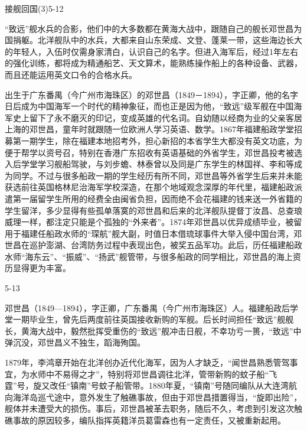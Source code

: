 \documentclass[12pt,UTF8]{ctexbook}
\begin{document}
接舰回国(3)5-12

“致远”舰水兵的合影，他们中的大多数都在黄海大战中，跟随自己的舰长邓世昌为国捐躯。北洋舰队中的水兵，大都来自山东荣成、文登、蓬莱一带，这些海边长大的年轻人，入伍时仅需身家清白，认识自己的名字。但进入海军后，经过1年左右的强化训练，都将成为精通船艺、天文算术，能熟练操作船上的各种设备、武器，而且还能运用英文口令的合格水兵。

出生于广东番禺（今广州市海珠区）的邓世昌（1849－1894），字正卿，他的名字日后成为中国海军一个时代的精神象征，而也正是因为他，“致远”级军舰在中国海军史上留下了永不磨灭的印记，变成英雄的代名词。自幼随以经商为业的父亲客居上海的邓世昌，童年时就跟随一位欧洲人学习英语、数学。1867年福建船政学堂招募第一期学生，除在福建本地招考外，担心新招的本省学生大都没有英文功底，为便于帮学以资号召，特别在香港广东招收有英语基础的外省学生，邓世昌投考被选入后学堂学习舰船驾驶，与刘步蟾、林泰曾以及同是广东学生的林国祥、李和等成为同学。不过与很多船政一期的学生经历有所不同，邓世昌等外省学生后来并未能获选前往英国格林尼治海军学校深造，在那个地域观念深厚的年代里，福建船政派遣第一届留学生所用的经费全由闽省负担，因而绝不会花福建的钱来送一外省籍的学生留洋，多少显得有些孤单落寞的邓世昌和后来的北洋舰队提督丁汝昌、总查琅威理一样，都注定只能是个孤独的“外来者”。1874年邓世昌以优异成绩毕业，被留用于福建任船政水师的“琛航”舰大副，时值日本借琉球事件大举入侵中国台湾，邓世昌在巡护澎湖、台湾防务过程中表现出色，被奖五品军功。此后，历任福建船政水师“海东云”、“振威”、“扬武”舰管带，与很多船政的同学相比，邓世昌的海上资历显得更为丰富。

5-13

邓世昌（1849—1894），字正卿，广东番禺（今广州市海珠区）人。福建船政后学堂一期毕业生，曾先后两度前往英国接收新购的军舰。后长时间担任“致远”舰舰长，黄海大战中，毅然批挥受重伤的“致远”舰冲击日舰，不幸功亏一篑，“致远”中弹沉没，邓世昌义不独生，蹈海殉国。

1879年，李鸿章开始在北洋创办近代化海军，因为人才缺乏，“闻世昌熟悉管驾事宜，为水师中不易得之才”，特别将邓世昌调往北洋，管带新购的蚊子船“飞霆”号，旋又改任“镇南”号蚊子船管带。1880年夏，“镇南”号随同编队从大连湾航向海洋岛巡弋途中，意外发生了触礁事故，但由于邓世昌措置得当，“旋即出险”，舰体并未遭受大的损伤。事后，邓世昌被革去职务，随后不久，考虑到引发这次触礁事故的原因较多，编队指挥英籍洋员葛雷森也有一定责任，又被重新起用。
\end{document}

